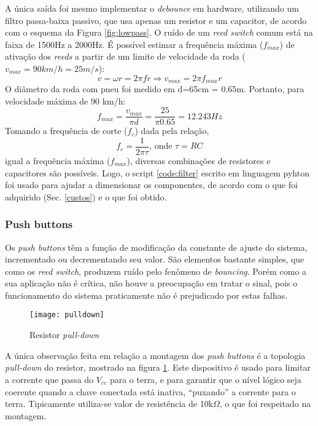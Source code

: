 \documentclass[a4paper,11pt]{article}
\begin{document}
A única saída foi mesmo implementar o \textit{debounce} em hardware, utilizando
um filtro passa-baixa passivo, que usa apenas um resistor e um capacitor, de
acordo com o esquema da Figura \ref{fig:lowpass}. O ruído de um \textit{reed
switch} comum está na faixa de 1500Hz a 2000Hz\cite{reed}. É possível estimar a
frequência máxima ($f_{max}$) de ativação dos \textit{reeds} a partir de um
limite de velocidade da roda ($v_{max} = 90 km/h = 25 m/s$):
\begin{equation}
  v = \omega r = 2\pi f r \Rightarrow v_{max} = 2\pi f_{max} r
\end{equation}
O diâmetro da roda com pneu foi medido em d=65cm = 0.65m. Portanto, para
velocidade máxima de 90 km/h:
\begin{equation}
  f_{max} = \frac{\displaystyle v_{max}}{\displaystyle \pi d} =
\frac{\displaystyle 25}{\displaystyle \pi 0.65} = 12.243 Hz
\end{equation}
Tomando a frequência de corte ($f_{c}$) dada pela relação,
\begin{equation}
  f_{c} = \frac{\displaystyle 1}{\displaystyle 2\pi\tau} \text{, onde } \tau =
RC
\end{equation}
igual a frequência máxima ($f_{max}$), diversas combinações de resistores e
capacitores são possíveis. Logo, o script \ref{code:filter} escrito em
linguagem pyhton\cite{python} foi usado para ajudar a dimensionar os
componentes, de acordo com o que foi adquirido (Sec. \ref{custos}) e o que foi
obtido.

\subsubsection{Push buttons}
\label{sec:buttons}
Os \textit{push buttons} têm a função de modificação da constante de ajuste do
sistema, incrementado ou decrementando seu valor. São elementos bastante
simples, que como os \textit{reed switch}, produzem ruído pelo fenômeno de
\textit{bouncing}. Porém como a sua aplicação não é crítica, não houve a
preocupação em tratar o sinal, pois o funcionamento do sistema praticamente não
é prejudicado por estas falhas.
\begin{figure}[ht]
\begin{center}
 \texttt{[image: pulldown]}
\end{center}
  \caption{Resistor \textit{pull-down}}
  \label{fig:pulldown}
\end{figure}

A única observação feita em relação a montagem dos \textit{push buttons} é a
topologia \textit{pull-down} do resistor, mostrado na figura \ref{fig:pulldown}.
Este dispositivo é usado para limitar a corrente que passa do $V_{cc}$ para o
terra, e para garantir que o nível lógico seja coerente quando a chave conectada
está inativa, ``puxando'' a corrente para o terra. Tipicamente utiliza-se valor
de resistência de 10k$\Omega$, o que foi respeitado na montagem.
\end{document}

